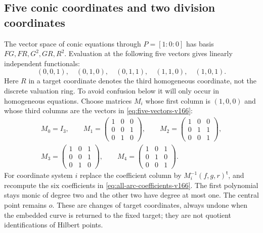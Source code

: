 \documentclass[11pt,reqno]{amsart}
\numberwithin{equation}{section}
\theoremstyle{definition}\newtheorem{definition}[theorem]{Definition}
\theoremstyle{remark}\newtheorem{remark}[theorem]{Remark}
\begin{document}
\subsection{Five conic coordinates and two division coordinates}
The vector space of conic equations through $P=[1:0:0]$ has basis
$FG,FR,G^2,GR,R^2$. Evaluation at the following five vectors gives
linearly independent functionals:
\begin{equation}\label{eq:five-vectors-v166}
 (0,0,1),\quad(0,1,0),\quad(0,1,1),\quad(1,1,0),\quad(1,0,1).
\end{equation}
Here $R$ in a target coordinate denotes the third homogeneous
coordinate, not the discrete valuation ring. To avoid confusion
below it will only occur in homogeneous equations.
Choose matrices $M_i$ whose first column is $(1,0,0)$ and whose
third columns are the vectors in \eqref{eq:five-vectors-v166}:
\begin{equation}\label{eq:five-matrices-v166}
\begin{gathered}
 M_0=I_3,\qquad
 M_1=\begin{pmatrix}1&0&0\\0&0&1\\0&1&0\end{pmatrix},\qquad
 M_2=\begin{pmatrix}1&0&0\\0&1&1\\0&0&1\end{pmatrix},\\
 M_3=\begin{pmatrix}1&0&1\\0&0&1\\0&1&0\end{pmatrix},\qquad
 M_4=\begin{pmatrix}1&0&1\\0&1&0\\0&0&1\end{pmatrix}.
\end{gathered}
\end{equation}
For coordinate system $i$ replace the coefficient column by
$M_i^{-1}(f,g,r)^{\mathsf t}$, and recompute the six coefficients
in \eqref{eq:all-arc-coefficients-v166}. The first polynomial stays
monic of degree two and the other two have degree at most one.
The central point remains $o$. These are changes of target
coordinates, always undone when the embedded curve is returned to
the fixed target; they are not quotient identifications of Hilbert
points.
\end{document}
